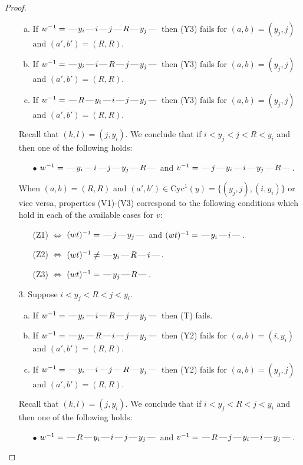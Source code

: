 \documentclass[10pt]{article}
\theoremstyle{definition}
\theoremstyle{definition}
\def\dash{\text{\hspace{0.5mm}---\hspace{0.5mm}}}
\def\Cyc{\mathrm{Cyc}}
\begin{document}
\begin{proof}
\begin{enumerate}
\begin{enumerate}[(a)]
\item If $w^{-1} = \dash y_i\dash i\dash j\dash R\dash y_j\dash $ then (Y3) fails for $(a,b)=(y_j,j)$ and $(a',b')=(R,R)$.
\item If $w^{-1} = \dash y_i\dash i\dash R\dash j\dash y_j\dash $ then (Y3) fails for $(a,b)=(y_j,j)$ and $(a',b')=(R,R)$.
\item If $w^{-1} = \dash R\dash y_i\dash i\dash j\dash y_j\dash $ then (Y3) fails for $(a,b)=(y_j,j)$ and $(a',b')=(R,R)$.
\end{enumerate}
Recall that $(k,l) = (j,y_i)$.
We conclude that if $i < y_j < j < R < y_i$ and then one of the following holds:
\begin{enumerate}
\item[$\bullet$] $w^{-1} = \dash y_i\dash i\dash j\dash y_j\dash R\dash $ and $v^{-1} = \dash j\dash y_i\dash i\dash y_j\dash R\dash $.
\end{enumerate}
When $(a,b)= (R, R)$ and $(a',b')\in \Cyc^1(y)=\{(y_j,j),(i,y_i)\}$ or vice versa,
properties (V1)-(V3) correspond to the following conditions which hold in
each of the available cases for $v$:
\begin{enumerate}
\item[](Z1) $\Leftrightarrow$ $(wt)^{-1} = \dash j \dash y_j \dash$  and $(wt)^{-1} = \dash y_i \dash i \dash$.
\item[](Z2) $\Leftrightarrow$ $(wt)^{-1} \neq \dash y_i \dash R \dash i \dash$.
\item[](Z3) $\Leftrightarrow$ $(wt)^{-1} = \dash y_j \dash R \dash$.
\end{enumerate}
\item[$3$.] Suppose $i < y_j < R < j < y_i$.
\begin{enumerate}[(a)]
\item If $w^{-1} = \dash y_i\dash i\dash R\dash j\dash y_j\dash $ then (T) fails.
\item If $w^{-1} = \dash y_i\dash R\dash i\dash j\dash y_j\dash $ then (Y2) fails for $(a,b)=(i,y_i)$ and $(a',b')=(R,R)$.
\item If $w^{-1} = \dash y_i\dash i\dash j\dash R\dash y_j\dash $ then (Y2) fails for $(a,b)=(y_j,j)$ and $(a',b')=(R,R)$.
\end{enumerate}
Recall that $(k,l) = (j,y_i)$.
We conclude that if $i < y_j < R < j < y_i$ and then one of the following holds:
\begin{enumerate}
\item[$\bullet$] $w^{-1} = \dash R\dash y_i\dash i\dash j\dash y_j\dash $ and $v^{-1} = \dash R\dash j\dash y_i\dash i\dash y_j\dash $.

\end{enumerate}
\end{enumerate}
\end{proof}
\end{document}
